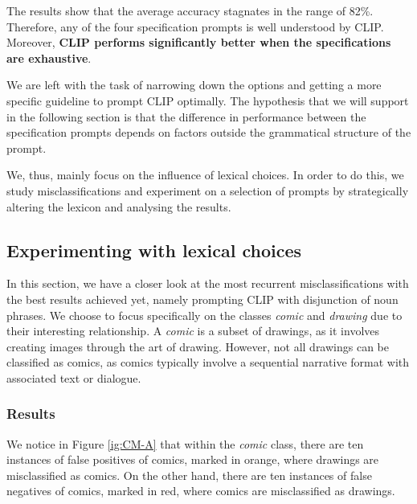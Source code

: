 The results show that the average accuracy stagnates in the range of 82\%. Therefore, any of the four specification prompts is well understood by CLIP. Moreover, \textbf{CLIP performs significantly better when the specifications are exhaustive}.


We are left with the task of narrowing down the options and getting a more specific guideline to prompt CLIP optimally. The hypothesis that we will support in the following section is that the difference in performance between the specification prompts depends on factors outside the grammatical structure of the prompt. 

We, thus, mainly focus on the influence of lexical choices. In order to do this, we study misclassifications and experiment on a selection of prompts by strategically altering the lexicon and analysing the results.




\subsection{Experimenting with lexical choices}

In this section, we have a closer look at the most recurrent misclassifications with the best results achieved yet, namely prompting CLIP with disjunction of noun phrases. We choose to focus specifically on the classes \textit{comic} and \textit{drawing} due to their interesting relationship. A \textit{comic} is a subset of drawings, as it involves creating images through the art of drawing. However, not all drawings can be classified as comics, as comics typically involve a sequential narrative format with associated text or dialogue.

\subsubsection{Results}

We notice in Figure \ref{ig:CM-A} that within the \textit{comic} class, there are ten instances of false positives of comics, marked in orange, where drawings are misclassified as comics. On the other hand, there are ten instances of false negatives of comics, marked in red, where comics are misclassified as drawings.

